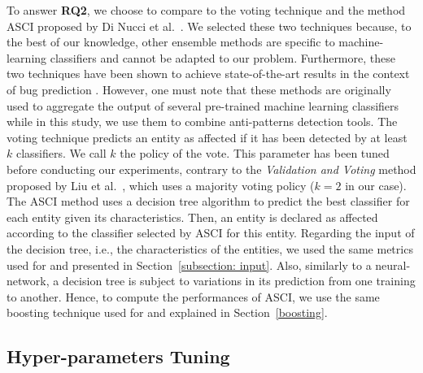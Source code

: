To answer \textbf{RQ2}, we choose to compare \NAME{} to the voting technique and the method ASCI proposed by Di Nucci et al.~\cite{di2017dynamic}. We selected these two techniques because, to the best of our knowledge, other ensemble methods are specific to machine-learning classifiers and cannot be adapted to our problem. Furthermore, these two techniques have been shown to achieve state-of-the-art results in the context of bug prediction \cite{wang2011software, liu2010evolutionary, di2017dynamic}. However, one must note that these methods are originally used to aggregate the output of several pre-trained machine learning classifiers while in this study, we use them to combine anti-patterns detection tools. The voting technique predicts an entity as affected if it has been detected by at least $k$ classifiers. We call $k$ the policy of the vote. This parameter has been tuned before conducting our experiments, contrary to the \textit{Validation and Voting} method proposed by Liu et al.~\cite{liu2010evolutionary}, which uses a majority voting policy ($k=2$ in our case). The ASCI method uses a decision tree algorithm to predict the best classifier for each entity given its characteristics. Then, an entity is declared as affected according to the classifier selected by ASCI for this entity. Regarding the input of the decision tree, i.e., the characteristics of the entities, we used the same metrics used for \NAME{} and presented in Section~\ref{subsection: input}. Also, similarly to a neural-network, a decision tree is subject to variations in its prediction from one training to another. Hence, to compute the performances of ASCI, we use the same boosting technique used for \NAME{} and explained in Section~\ref{boosting}. 

\subsection{Hyper-parameters Tuning}


